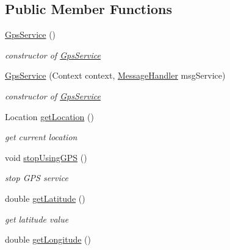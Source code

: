 \subsection*{Public Member Functions}
\begin{DoxyCompactItemize}
\item 
\mbox{\hyperlink{classhi_1_1world_1_1hello_1_1myapplication_1_1_gps_service_ae221c88a83cc05e7694bd0ca40fc9e3c}{Gps\+Service}} ()
\begin{DoxyCompactList}\small\item\em constructor of \mbox{\hyperlink{classhi_1_1world_1_1hello_1_1myapplication_1_1_gps_service}{Gps\+Service}} \end{DoxyCompactList}\item 
\mbox{\hyperlink{classhi_1_1world_1_1hello_1_1myapplication_1_1_gps_service_a5a919ba62585c257c1d9610cb81a318f}{Gps\+Service}} (Context context, \mbox{\hyperlink{classhi_1_1world_1_1hello_1_1myapplication_1_1_message_handler}{Message\+Handler}} msg\+Service)
\begin{DoxyCompactList}\small\item\em constructor of \mbox{\hyperlink{classhi_1_1world_1_1hello_1_1myapplication_1_1_gps_service}{Gps\+Service}} \end{DoxyCompactList}\item 
Location \mbox{\hyperlink{classhi_1_1world_1_1hello_1_1myapplication_1_1_gps_service_aa08695320afe385d4473536031c068ef}{get\+Location}} ()
\begin{DoxyCompactList}\small\item\em get current location \end{DoxyCompactList}\item 
void \mbox{\hyperlink{classhi_1_1world_1_1hello_1_1myapplication_1_1_gps_service_a513cfde440fac8249b3e7145785b4483}{stop\+Using\+G\+PS}} ()
\begin{DoxyCompactList}\small\item\em stop G\+PS service \end{DoxyCompactList}\item 
double \mbox{\hyperlink{classhi_1_1world_1_1hello_1_1myapplication_1_1_gps_service_a63324e92926b66e02162b4e191dd57f2}{get\+Latitude}} ()
\begin{DoxyCompactList}\small\item\em get latitude value \end{DoxyCompactList}\item 
double \mbox{\hyperlink{classhi_1_1world_1_1hello_1_1myapplication_1_1_gps_service_a61286d98bc3a0a7a165297c9725dfba4}{get\+Longitude}} ()

\end{DoxyCompactItemize}
